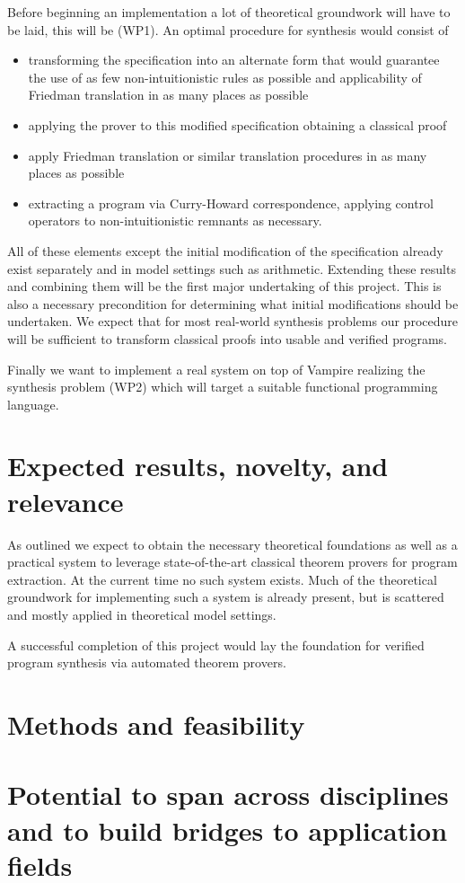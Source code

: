 \documentclass[onehalfspacing]{article}
\begin{document}
	Before beginning an implementation a lot of theoretical groundwork will have to be laid, this will be (WP1). An optimal procedure for synthesis would consist of
	\begin{itemize}
		\item transforming the specification into an alternate form that would guarantee the use of as few non-intuitionistic rules as possible and applicability of Friedman translation in as many places as possible
		\item applying the prover to this modified specification obtaining a classical proof
		\item apply Friedman translation or similar translation procedures in as many places as possible
		\item extracting a program via Curry-Howard correspondence, applying control operators to non-intuitionistic remnants as necessary.
	\end{itemize}
	All of these elements except the initial modification of the specification already exist separately and in model settings such as arithmetic. Extending these results and combining them will be the first major undertaking of this project. This is also a necessary precondition for determining what initial modifications should be undertaken. We expect that for most real-world synthesis problems our procedure will be sufficient to transform classical proofs into usable and verified programs.
	
	Finally we want to implement a real system on top of Vampire realizing the synthesis problem (WP2) which will target a suitable functional programming language.
	
	\section{Expected results, novelty, and relevance}
	
	As outlined we expect to obtain the necessary theoretical foundations as well as a practical system to leverage state-of-the-art classical theorem provers for program extraction. At the current time no such system exists. Much of the theoretical groundwork for implementing such a system is already present, but is scattered and mostly applied in  theoretical model settings. 

	A successful completion of this project would lay the foundation for verified program synthesis via automated theorem provers.

	\section{Methods and feasibility}
	
	\section{Potential to span across disciplines and to build bridges to application fields}
	
	
	
	
\end{document}
